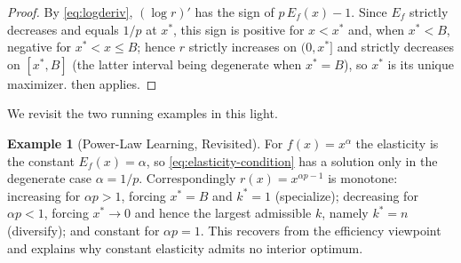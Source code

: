 \documentclass[11pt]{article}
\theoremstyle{definition}
\newtheorem{example}[theorem]{Example}
\theoremstyle{remark}
\newcommand{\eff}{r}
\newcommand{\elas}{E}
\begin{document}
\begin{proof}
By \eqref{eq:logderiv}, \((\log\eff)'\) has the sign of
\(p\,\elas_f(x)-1\). Since \(\elas_f\) strictly decreases and equals \(1/p\)
at \(x^*\), this sign is positive for \(x<x^*\) and, when \(x^*<B\), negative
for \(x^*<x\leq B\); hence \(\eff\) strictly increases on \((0,x^*]\) and
strictly decreases on \([x^*,B]\) (the latter interval being degenerate when
\(x^*=B\)), so \(x^*\) is its unique maximizer.  then
applies.
\end{proof}

We revisit the two running examples in this light.

\begin{example}[Power-Law Learning, Revisited]
\label{ex:power-law-elasticity}
For \(f(x)=x^\alpha\) the elasticity is the constant \(\elas_f(x)=\alpha\),
so \eqref{eq:elasticity-condition} has a solution only in the degenerate
case \(\alpha=1/p\). Correspondingly \(\eff(x)=x^{\alpha p-1}\) is
monotone: increasing for \(\alpha p>1\), forcing \(x^*=B\) and \(k^*=1\)
(specialize); decreasing for \(\alpha p<1\), forcing \(x^*\to0\) and hence
the largest admissible \(k\), namely \(k^*=n\) (diversify); and constant for
\(\alpha p=1\). This recovers  from the efficiency
viewpoint and explains why constant elasticity admits no interior optimum.
\end{example}
\end{document}

